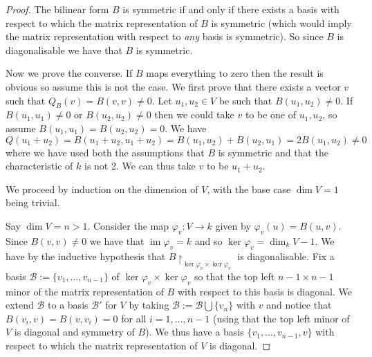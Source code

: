 \documentclass[12pt]{article}
\theoremstyle{plain}
\theoremstyle{definition}
\newcommand{\scr}[1]{\mathscr{#1}}
\newcommand{\lto}{\longrightarrow}
\begin{document}
\begin{proof}
The bilinear form $B$ is symmetric if and only if there exists a basis with respect to which the matrix representation of $B$ is symmetric (which would imply the matrix representation with respect to \emph{any} basis is symmetric). So since $B$ is diagonalisable we have that $B$ is symmetric.

Now we prove the converse. If $B$ maps everything to zero then the result is obvious so assume this is not the case. We first prove that there exists a vector $v$ such that $Q_B(v) = B(v,v) \neq 0$. Let $u_1,u_2 \in V$ be such that $B(u_1,u_2) \neq 0$. If $B(u_1,u_1) \neq 0$ or $B(u_2,u_2) \neq 0$ then we could take $v$ to be one of $u_1,u_2$, so assume $B(u_1,u_1) = B(u_2,u_2) = 0$. We have
\begin{equation}
Q(u_1 + u_2) = B(u_1 + u_2, u_1 + u_2) = B(u_1,u_2) + B(u_2,u_1) = 2B(u_1,u_2) \neq 0
\end{equation}
where we have used both the assumptions that $B$ is symmetric and that the characteristic of $k$ is not 2. We can thus take $v$ to be $u_1 + u_2$.

We proceed by induction on the dimension of $V$, with the base case $\operatorname{dim}V = 1$ being trivial.

Say $\operatorname{dim}V = n > 1$. Consider the map $\varphi_v: V \lto k$ given by $\varphi_v(u) = B(u,v)$. Since $B(v,v) \neq 0$ we have that $\operatorname{im}\varphi_v = k$ and so $\operatorname{ker}\varphi_v = \operatorname{dim}_kV - 1$. We have by the inductive hypothesis that $B\restriction_{\operatorname{ker}\varphi_v \times \operatorname{ker}\varphi_v}$ is diagonalisable. Fix a basis $\scr{B} := \lbrace v_1,...,v_{n-1}\rbrace$ of $\operatorname{ker}\varphi_v \times \operatorname{ker}\varphi_v$ so that the top left $n-1 \times n-1$ minor of the matrix representation of $B$ with respect to this basis is diagonal. We extend $\scr{B}$ to a basis $\scr{B}'$ for $V$ by taking $\scr{B} := \scr{B} \bigcup \lbrace v_n\rbrace$ with $v$ and notice that $B(v_i,v) = B(v,v_i) = 0$ for all $i = 1,...,n-1$ (using that the top left minor of $V$ is diagonal and symmetry of $B$). We thus have a basis $\lbrace v_1,...,v_{n-1},v\rbrace$ with respect to which the matrix representation of $V$ is diagonal.
\end{proof}
\end{document}
